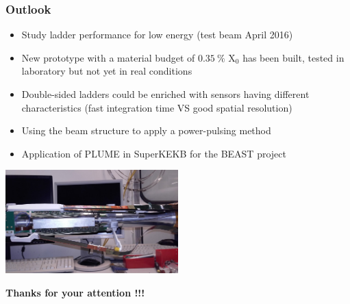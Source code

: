\documentclass{beamer}
\begin{document}
\begin{frame}
  \frametitle{Outlook}

  \footnotesize
  \begin{itemize}
    \item Study ladder performance for low energy (test beam April 2016)
    \item New prototype with a material budget of $0.35~\%$ X$_0$ has been built, tested in laboratory but not yet in real conditions
    \item Double-sided ladders could be enriched with sensors having different characteristics (fast integration time VS good spatial resolution)
    \item Using the beam structure to apply a power-pulsing method
    \item Application of PLUME in SuperKEKB for the BEAST project
  \end{itemize}

  \vspace{-0.2cm}
  \begin{center}
    \includegraphics[width = 0.5\textwidth]{Pictures/plumeInTableDesySetup.jpg}
  \end{center}

\end{frame}

\begin{frame}
  \begin{center}
    \huge
    \textbf{Thanks for your attention !!!}
  \end{center}
\end{frame}

  \appendix
  \setcounter{lastframe}{\insertframenumber}
\end{document}
